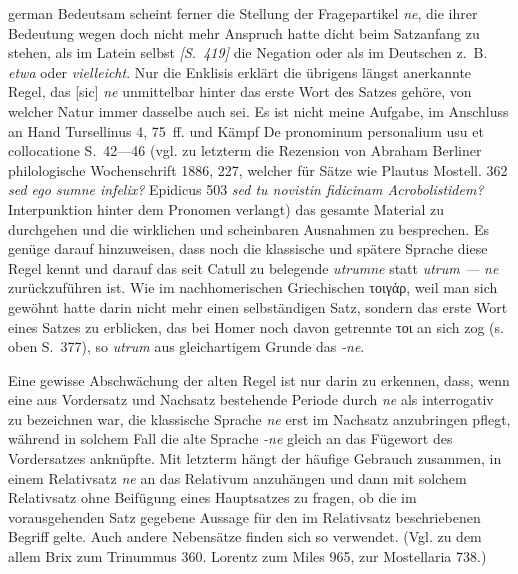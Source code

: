 \begin{otherlanguage*}{german}
Bedeutsam scheint ferner die Stellung der Fragepartikel \emph{ne}, die ihrer Bedeutung wegen doch nicht mehr Anspruch hatte dicht beim Satzanfang zu stehen, als im Latein selbst \hypertarget{p419}{\emph{[S.~419]}}\label{p419} die Negation oder als im Deutschen z.~B. \emph{etwa} oder \emph{vielleicht}. Nur die Enklisis erklärt die übrigens längst anerkannte Regel, das [sic] \emph{ne} unmittelbar hinter das erste Wort des Satzes gehöre, von welcher Natur immer dasselbe auch sei. Es ist nicht meine Aufgabe, im Anschluss an Hand Tursellinus 4, 75~ff. und Kämpf De pronominum personalium usu et collocatione S.~42—46 (vgl. zu letzterm die Rezension von Abraham Berliner philologische Wochenschrift 1886, 227, welcher für Sätze wie Plautus Mostell. 362 \emph{sed ego sumne infelix?} Epidicus 503 \emph{sed tu novistin fidicinam Acrobolistidem?} Interpunktion hinter dem Pronomen verlangt) das gesamte Material zu durchgehen und die wirklichen und scheinbaren Ausnahmen zu besprechen. Es genüge darauf hinzuweisen, dass noch die klassische und spätere Sprache diese Regel kennt und darauf das seit Catull zu belegende \emph{utrumne} statt \emph{utrum — ne} zurückzuführen ist. Wie im nachhomerischen Griechischen τοιγάρ, weil man sich gewöhnt hatte darin nicht mehr einen selbständigen Satz, sondern das erste Wort eines Satzes zu erblicken, das bei Homer noch davon getrennte τοι an sich zog (s. oben S.~377), so \emph{utrum} aus gleichartigem Grunde das \emph{‑ne}.

Eine gewisse Abschwächung der alten Regel ist nur darin zu erkennen, dass, wenn eine aus Vordersatz und Nachsatz bestehende Periode durch \emph{ne} als interrogativ zu bezeichnen war, die klassische Sprache \emph{ne} erst im Nachsatz anzubringen pflegt, während in solchem Fall die alte Sprache \emph{-ne} gleich an das Fügewort des Vordersatzes anknüpfte. Mit letzterm hängt der häufige Gebrauch zusammen, in einem Relativsatz \emph{ne} an das Relativum anzuhängen und dann mit solchem Relativsatz ohne Beifügung eines Hauptsatzes zu fragen, ob die im vorausgehenden Satz gegebene Aussage für den im Relativsatz beschriebenen Begriff gelte. Auch andere Nebensätze finden sich so verwendet. (Vgl. zu dem allem Brix zum Trinummus 360. Lorentz zum Miles 965, zur Mostellaria 738.)


\end{otherlanguage*}
